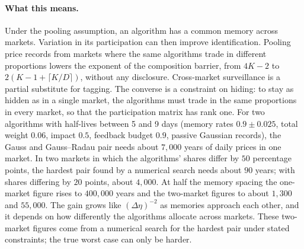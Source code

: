 \documentclass[12pt]{article}
\theoremstyle{definition}
\theoremstyle{remark}
\begin{document}
\paragraph{What this means.} Under the pooling assumption, an algorithm has a common memory across markets. Variation in its participation can then improve identification. Pooling price records from markets where the same algorithms trade in different proportions lowers the exponent of the composition barrier, from $4K-2$ to $2(K-1+\lceil K/D\rceil)$, without any disclosure. Cross-market surveillance is a partial substitute for tagging. The converse is a constraint on hiding: to stay as hidden as in a single market, the algorithms must trade in the same proportions in every market, so that the participation matrix has rank one. For two algorithms with half-lives between 5 and 9 days (memory rates $0.9\pm0.025$, total weight $0.06$, impact $0.5$, feedback budget $0.9$, passive Gaussian records), the Gauss and Gauss--Radau pair needs about $7{,}000$ years of daily prices in one market. In two markets in which the algorithms' shares differ by $50$ percentage points, the hardest pair found by a numerical search needs about $90$ years; with shares differing by $20$ points, about $4{,}000$. At half the memory spacing the one-market figure rises to $400{,}000$ years and the two-market figures to about $1{,}300$ and $55{,}000$. The gain grows like $(\Delta\eta)^{-2}$ as memories approach each other, and it depends on how differently the algorithms allocate across markets. These two-market figures come from a numerical search for the hardest pair under stated constraints; the true worst case can only be harder.
\end{document}
